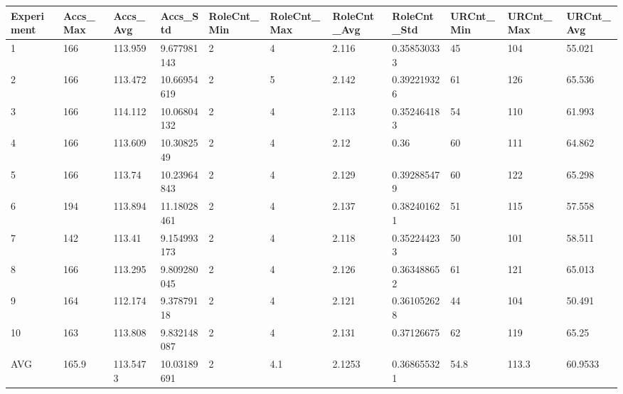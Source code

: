 \begin{table}[H]
\begin{adjustbox}{max width=380pt,keepaspectratio,angle=90}
\begin{tabular}{|l|l|l|l|l|l|l|l|l|l|l|}
				\end{tabular}
			\end{adjustbox}
			\begin{adjustbox}{max width=380pt,keepaspectratio,angle=90}
				\begin{tabular}{|l|l|l|l|l|l|l|l|l|l|l|}
					\rowcolor[HTML]{EFEFEF} 
					\hline
					Experiment & Accs\_Max & Accs\_Avg & Accs\_Std   & RoleCnt\_Min & RoleCnt\_Max & RoleCnt\_Avg & RoleCnt\_Std & URCnt\_Min & URCnt\_Max & URCnt\_Avg \\ \hline
					1          & 166       & 113.959   & 9.677981143 & 2            & 4            & 2.116        & 0.358530333  & 45         & 104        & 55.021     \\ \hline
					2          & 166       & 113.472   & 10.66954619 & 2            & 5            & 2.142        & 0.392219326  & 61         & 126        & 65.536     \\ \hline
					3          & 166       & 114.112   & 10.06804132 & 2            & 4            & 2.113        & 0.352464183  & 54         & 110        & 61.993     \\ \hline
					4          & 166       & 113.609   & 10.3082549  & 2            & 4            & 2.12         & 0.36         & 60         & 111        & 64.862     \\ \hline
					5          & 166       & 113.74    & 10.23964843 & 2            & 4            & 2.129        & 0.392885479  & 60         & 122        & 65.298     \\ \hline
					6          & 194       & 113.894   & 11.18028461 & 2            & 4            & 2.137        & 0.382401621  & 51         & 115        & 57.558     \\ \hline
					7          & 142       & 113.41    & 9.154993173 & 2            & 4            & 2.118        & 0.352244233  & 50         & 101        & 58.511     \\ \hline
					8          & 166       & 113.295   & 9.809280045 & 2            & 4            & 2.126        & 0.363488652  & 61         & 121        & 65.013     \\ \hline
					9          & 164       & 112.174   & 9.37879118  & 2            & 4            & 2.121        & 0.361052628  & 44         & 104        & 50.491     \\ \hline
					10         & 163       & 113.808   & 9.832148087 & 2            & 4            & 2.131        & 0.37126675   & 62         & 119        & 65.25      \\ \hline\hline
					AVG        & 165.9     & 113.5473  & 10.03189691 & 2            & 4.1          & 2.1253       & 0.368655321  & 54.8       & 113.3      & 60.9533    \\ \hline

\end{tabular}
\end{adjustbox}
\end{table}
